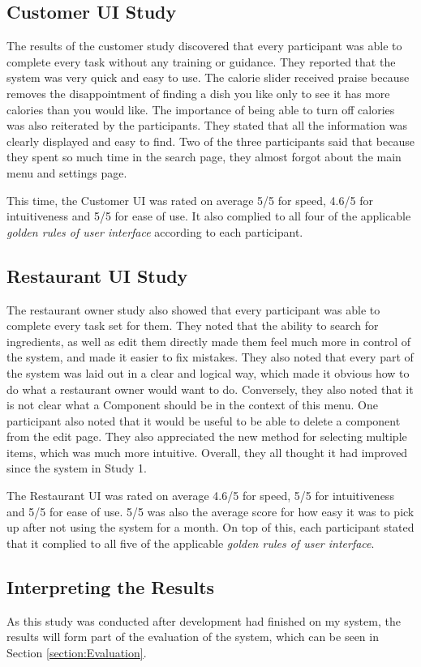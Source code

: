\subsection{Customer UI Study}

The results of the customer study discovered that every participant was able to complete every task without any training or guidance. They reported that the system was very quick and easy to use. The calorie slider received praise because removes the disappointment of finding a dish you like only to see it has more calories than you would like. The importance of being able to turn off calories was also reiterated by the participants. They stated that all the information was clearly displayed and easy to find. Two of the three participants said that because they spent so much time in the search page, they almost forgot about the main menu and settings page.

This time, the Customer UI was rated on average 5/5 for speed, 4.6/5 for intuitiveness and 5/5 for ease of use. It also complied to all four of the applicable \textit{golden rules of user interface} according to each participant. 

\subsection{Restaurant UI Study}

The restaurant owner study also showed that every participant was able to complete every task set for them. They noted that the ability to search for ingredients, as well as edit them directly made them feel much more in control of the system, and made it easier to fix mistakes. They also noted that every part of the system was laid out in a clear and logical way, which made it obvious how to do what a restaurant owner would want to do. Conversely, they also noted that it is not clear what a Component should be in the context of this menu. One participant also noted that it would be useful to be able to delete a component from the edit page. They also appreciated the new method for selecting multiple items, which was much more intuitive. Overall, they all thought it had improved since the system in Study 1.

The Restaurant UI was rated on average 4.6/5 for speed, 5/5 for intuitiveness and 5/5 for ease of use. 5/5 was also the average score for how easy it was to pick up after not using the system for a month. On top of this, each participant stated that it complied to all five of the applicable \textit{golden rules of user interface}.

\subsection{Interpreting the Results}

As this study was conducted after development had finished on my system, the results will form part of the evaluation of the system, which can be seen in Section \ref{section:Evaluation}.

